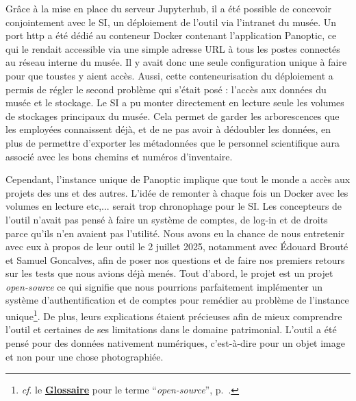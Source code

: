 Grâce à la mise en place du serveur Jupyterhub, il a été possible de concevoir conjointement avec le SI, un déploiement de l'outil via l'intranet du musée. Un port http a été dédié au conteneur Docker contenant l'application Panoptic, ce qui le rendait accessible via une simple adresse URL à tous les postes connectés au réseau interne du musée. Il y avait donc une seule configuration unique à faire pour que tous\wokisme tes y aient accès. Aussi, cette conteneurisation du déploiement a permis de régler le second problème qui s'était posé : l'accès aux données du musée et le stockage. Le SI a pu monter directement en lecture seule les volumes de stockages principaux du musée. Cela permet de garder les arborescences que les employé\wokisme e\wokisme s connaissent déjà, et de ne pas avoir à dédoubler les données, en plus de permettre d'exporter les métadonnées que le personnel scientifique aura associé avec les bons chemins et numéros d'inventaire. 

Cependant, l'instance unique de Panoptic implique que tout le monde a accès aux projets des uns et des autres. L'idée de remonter à chaque fois un Docker avec les volumes en lecture etc,... serait trop chronophage pour le SI. Les concepteurs de l'outil n'avait pas pensé à faire un système de comptes, de log-in et de droits parce qu'ils n'en avaient pas l'utilité. Nous avons eu la chance de nous entretenir avec eux à propos de leur outil le 2 juillet 2025, notamment avec Édouard Brouté et Samuel Goncalves, afin de poser nos questions et de faire nos premiers retours sur les tests que nous avions déjà menés. Tout d'abord, le projet est un projet \textit{open-source} ce qui signifie que nous pourrions parfaitement implémenter un système d'authentification et de comptes pour remédier au problème de l'instance unique\footnote{\textit{cf}. le \textbf{\hyperref[sec:Glossaire]{Glossaire}} pour le terme \enquote{\textit{open-source}}, p.~\pageref{sec:Glossaire}.}. De plus, leurs explications étaient précieuses afin de mieux comprendre l'outil et certaines de ses limitations dans le domaine patrimonial. L'outil a été pensé pour des données nativement numériques, c'est-à-dire pour un objet image et non pour une chose photographiée. 

